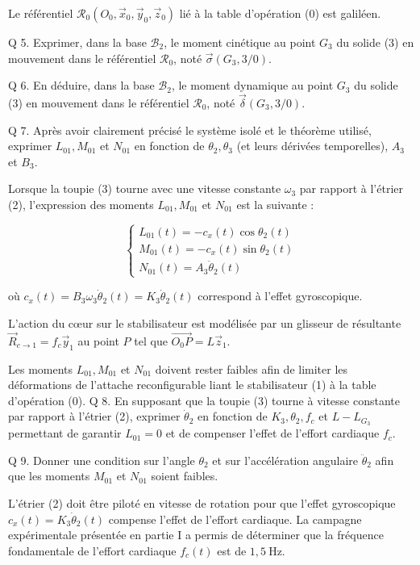 \documentclass[10pt]{article}
\begin{document}
Le référentiel $\mathcal{R}_{0}\left(O_{0}, \vec{x}_{0}, \vec{y}_{0}, \vec{z}_{0}\right)$ lié à la table d'opération (0) est galiléen.

Q 5. Exprimer, dans la base $\mathcal{B}_{2}$, le moment cinétique au point $G_{3}$ du solide (3) en mouvement dans le référentiel $\mathcal{R}_{0}$, noté $\vec{\sigma}\left(G_{3}, 3 / 0\right)$.

Q 6. En déduire, dans la base $\mathcal{B}_{2}$, le moment dynamique au point $G_{3}$ du solide (3) en mouvement dans le référentiel $\mathcal{R}_{0}$, noté $\vec{\delta}\left(G_{3}, 3 / 0\right)$.

Q 7. Après avoir clairement précisé le système isolé et le théorème utilisé, exprimer $L_{01}, M_{01}$ et $N_{01}$ en fonction de $\theta_{2}, \theta_{3}$ (et leurs dérivées temporelles), $A_{3}$ et $B_{3}$.

Lorsque la toupie (3) tourne avec une vitesse constante $\omega_{3}$ par rapport à l'étrier (2), l'expression des moments $L_{01}, M_{01}$ et $N_{01}$ est la suivante :

$$
\left\{\begin{array}{l}
L_{01}(t)=-c_{x}(t) \cos \theta_{2}(t) \\
M_{01}(t)=-c_{x}(t) \sin \theta_{2}(t) \\
N_{01}(t)=A_{3} \ddot{\theta}_{2}(t)
\end{array}\right.
$$

où $c_{x}(t)=B_{3} \omega_{3} \dot{\theta}_{2}(t)=K_{3} \dot{\theta}_{2}(t)$ correspond à l'effet gyroscopique.

L'action du cœur sur le stabilisateur est modélisée par un glisseur de résultante $\vec{R}_{c \rightarrow 1}=f_{c} \vec{y}_{1}$ au point $P$ tel que $\overrightarrow{O_{0} P}=L \vec{z}_{1}$.

Les moments $L_{01}, M_{01}$ et $N_{01}$ doivent rester faibles afin de limiter les déformations de l'attache reconfigurable liant le stabilisateur (1) à la table d'opération (0). Q 8. En supposant que la toupie (3) tourne à vitesse constante par rapport à l'étrier (2), exprimer $\dot{\theta}_{2}$ en fonction de $K_{3}, \theta_{2}, f_{c}$ et $L-L_{G_{3}}$ permettant de garantir $L_{01}=0$ et de compenser l'effet de l'effort cardiaque $f_{c}$.

Q 9. Donner une condition sur l'angle $\theta_{2}$ et sur l'accélération angulaire $\ddot{\theta}_{2}$ afin que les moments $M_{01}$ et $N_{01}$ soient faibles.

L'étrier (2) doit être piloté en vitesse de rotation pour que l'effet gyroscopique $c_{x}(t)=K_{3} \dot{\theta}_{2}(t)$ compense l'effet de l'effort cardiaque. La campagne expérimentale présentée en partie I a permis de déterminer que la fréquence fondamentale de l'effort cardiaque $f_{c}(t)$ est de $1,5 \mathrm{~Hz}$.
\end{document}
